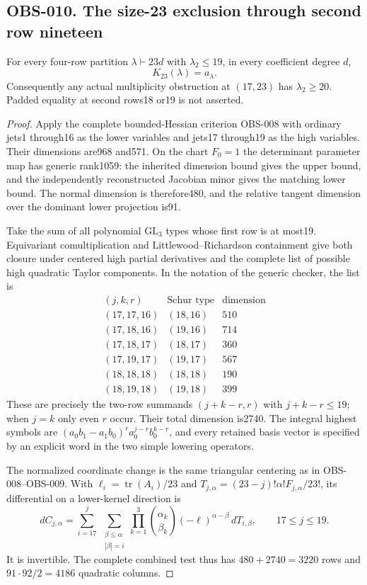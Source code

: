 \subsection*{OBS-010. The size-23 exclusion through second row nineteen}
For every four-row partition $\lambda\vdash23d$ with
$\lambda_2\le19$, in every coefficient degree $d$,
\[
                         K_{23}(\lambda)=a_\lambda.
\tag{OBS-010.1}
\]
Consequently any actual multiplicity obstruction at $(17,23)$ has
$\lambda_2\ge20$. Padded equality at second rows18 or19 is not asserted.

\begin{proof}
Apply the complete bounded-Hessian criterion OBS-008 with ordinary
jets1 through16 as the lower variables and jets17 through19 as the
high variables. Their dimensions are968 and571. On the chart $F_0=1$
the determinant parameter map has generic rank1059: the inherited
dimension bound gives the upper bound, and the independently reconstructed
Jacobian minor gives the matching lower bound. The normal dimension
is therefore480, and the relative tangent dimension over the dominant
lower projection is91.

Take the sum of all polynomial $\mathrm{GL}_3$ types whose first
row is at most19. Equivariant comultiplication and
Littlewood--Richardson containment give both closure under centered
high partial derivatives and the complete list of possible high
quadratic Taylor components. In the notation of the generic checker,
the list is
\[
\begin{array}{c|c|r}
(j,k,r)&\text{Schur type}&\text{dimension}\\\hline
(17,17,16)&(18,16)&510\\
(17,18,16)&(19,16)&714\\
(17,18,17)&(18,17)&360\\
(17,19,17)&(19,17)&567\\
(18,18,18)&(18,18)&190\\
(18,19,18)&(19,18)&399
\end{array}
\]
These are precisely the two-row summands $(j+k-r,r)$ with
$j+k-r\le19$; when $j=k$ only even $r$ occur. Their total dimension
is2740. The integral highest symbols are
$(a_0b_1-a_1b_0)^r a_0^{j-r}b_0^{k-r}$, and every retained basis
vector is specified by an explicit word in the two simple lowering
operators.

The normalized coordinate change is the same triangular centering as
in OBS-008--OBS-009. With $\ell_i=\operatorname{tr}(A_i)/23$ and
$T_{j,\alpha}=(23-j)!\alpha!F_{j,\alpha}/23!$, its differential
on a lower-kernel direction is
\[
 dC_{j,\alpha}=
 \sum_{i=17}^{j}\ \sum_{\substack{\beta\le\alpha\\|\beta|=i}}
   \prod_{k=1}^3\binom{\alpha_k}{\beta_k}
   (-\ell)^{\alpha-\beta}\,dT_{i,\beta},\qquad17\le j\le19.
\]
It is invertible. The complete combined test thus has
$480+2740=3220$ rows and $91\cdot92/2=4186$ quadratic columns.


\end{proof}
